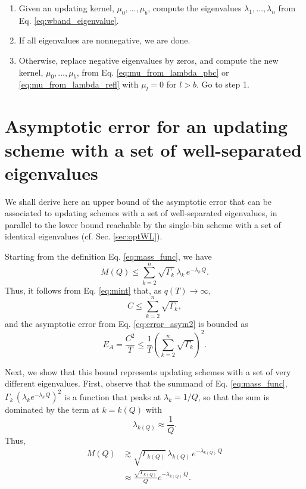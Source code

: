 \documentclass[reprint, floatfix]{revtex4-1}
\begin{document}
%
\begin{enumerate}
  \item
    Given an updating kernel, $\mu_0, \dots, \mu_b$,
    compute the eigenvalues
    $\lambda_1, \dots, \lambda_n$
    from Eq. \eqref{eq:wband_eigenvalue}.
  \item
    If all eigenvalues are nonnegative,
    we are done. %
  \item
    Otherwise, replace negative eigenvalues by zeros,
    and compute the new kernel,
    $\mu_0, \dots, \mu_b$, from
    Eq. \eqref{eq:mu_from_lambda_pbc}
    or
    \eqref{eq:mu_from_lambda_refl}
    with $\mu_l = 0$ for $l > b$.
    Go to step 1.
\end{enumerate}


\section{\label{sec:upperbound}
Asymptotic error for an updating scheme
with a set of well-separated eigenvalues}


We shall derive here an upper bound of the asymptotic error
that can be associated to updating schemes
with a set of well-separated eigenvalues,
in parallel to the lower bound reachable by
the single-bin scheme with a set of identical eigenvalues
(cf. Sec. \ref{sec:optWL}).


Starting from the definition Eq. \eqref{eq:mass_func}, we have
$$
  M(Q)
  \le
  \sum_{k = 2}^n
  \sqrt{ \Gamma_k } \, \lambda_k \, e^{ -\lambda_k \, Q }
  .
$$
Thus,
it follows from Eq. \eqref{eq:mint} that, as $q(T) \to \infty$,
\begin{equation}
  C
  \le
  \sum_{k = 2}^n \sqrt{ \Gamma_k }
  ,
  \label{eq:mint_ubound}
\end{equation}
and the asymptotic error from Eq. \eqref{eq:error_asym2}
is bounded as
\begin{equation}
  E_A
  =
  \frac{ C^2 } { T }
  \le
  \frac 1 T
  \left(
    \sum_{k=2}^n \sqrt{ \Gamma_k }
  \right)^2
  .
  \label{eq:error_asym_ubound}
\end{equation}


Next, we show that this bound represents
updating schemes with a set of very different eigenvalues.
%
First, observe that the summand of Eq. \eqref{eq:mass_func},
$\Gamma_k \, \left( \lambda_k e^{-\lambda_k \, Q} \right)^2$
is a function that peaks at $\lambda_k = 1/Q$,
so that the sum is dominated by the term at $k = k(Q)$ with
%
\begin{equation}
  \lambda_{k(Q)}
  \approx
  \frac 1 Q
  .
  \label{eq:kQ_def}
\end{equation}
%
Thus,
\begin{align}
  M(Q)
  &
  \gtrsim
  \sqrt{ \Gamma_{ k(Q) } } \,
  \lambda_{ k(Q) } \,
  e^{ -\lambda_{ k(Q) } \, Q }
\label{eq:MQ_lbound1}
  \\
  &
  \approx
  \frac{ \sqrt{ \Gamma_{ k(Q) } } }
       { Q }
  e^{ -\lambda_{ k(Q) } \, Q }
  .
\label{eq:MQ_lbound}
\end{align}
\end{document}
